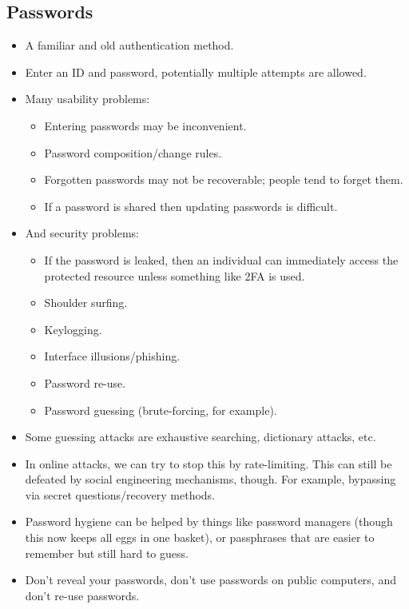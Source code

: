 \documentclass{article}
\begin{document}
\subsection{Passwords}
\begin{itemize}
    \item A familiar and old authentication method.
    \item Enter an ID and password, potentially multiple attempts are allowed.
    \item Many usability problems:
        \begin{itemize}
            \item Entering passwords may be inconvenient.
            \item Password composition/change rules.
            \item Forgotten passwords may not be recoverable; people tend to forget them.
            \item If a password is shared then updating passwords is difficult.
        \end{itemize}
    \item And security problems:
        \begin{itemize}
            \item If the password is leaked, then an individual can immediately access the protected resource unless something like 2FA is used.
            \item Shoulder surfing.
            \item Keylogging.
            \item Interface illusions/phishing.
            \item Password re-use.
            \item Password guessing (brute-forcing, for example).
        \end{itemize}
    \item Some guessing attacks are exhaustive searching, dictionary attacks, etc.
    \item In online attacks, we can try to stop this by rate-limiting.  This can still be defeated by social engineering mechanisms, though.  For example, bypassing via secret questions/recovery methods.
    \item Password hygiene can be helped by things like password managers (though this now keeps all eggs in one basket), or passphrases that are easier to remember but still hard to guess.
    \item Don't reveal your passwords, don't use passwords on public computers, and don't re-use passwords.

\end{itemize}
\end{document}
